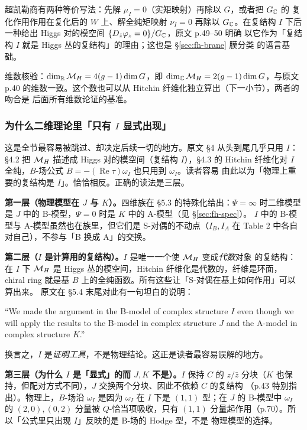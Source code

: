 \begin{remark}[两种商描述]
超凯勒商有两种等价写法：先解 $\mu_I=0$（实矩映射）再除以 $G$，或者把 $G_{\mathbb{C}}$ 的
复化作用作用在复化后的 $W$ 上、解全纯矩映射 $\nu_I=0$ 再除以 $G_{\mathbb{C}}$。在复结构 $I$
下后一种给出 Higgs 对的模空间 $\{D_{\bar z}\varphi_z=0\}/G_{\mathbb{C}}$，原文 p.49--50 明确
以它作为「复结构 $I$ 就是 Higgs 丛的复结构」的理由；这也是 §\ref{sec:fh-brane} 膜分类
的语言基础。\pA{}
\end{remark}

维数核验：$\dim_{\mathbb{R}}\mathcal{M}_H=4(g-1)\dim G$，即 $\dim_{\mathbb{C}}\mathcal{M}_H=2(g-1)\dim G$，与原文
p.40 的维数一致。这个数也可以从 Hitchin 纤维化独立算出（下一小节），两者的吻合是
后面所有维数论证的基准。\pA{}

\subsubsection*{为什么二维理论里「只有 $I$ 显式出现」}

这是全节最容易被跳过、却决定后续一切的地方。原文 §4 从头到尾几乎只用 $I$：
§4.2 把 $\mathcal{M}_H$ 描述成 Higgs 对的模空间（复结构 $I$），§4.3 的 Hitchin 纤维化对 $I$
全纯，$B$-场公式 $B=-(\operatorname{Re}\tau)\omega_I$ 也只用到 $\omega_I$。读者容易
由此以为「物理上重要的复结构是 $I$」。恰恰相反。正确的读法是三层。

\textbf{第一层（物理模型在 $J$ 与 $K$）。}四维族在 §5.3 的特殊化给出：$\Psi=\infty$
时二维模型是 $J$ 中的 B-模型，$\Psi=0$ 时是 $K$ 中的 A-模型（见 §\ref{sec:fh-spec}）。
$I$ 中的 B-模型与 A-模型虽然也在族里，但它们是 S-对偶的不动点（$I_B,I_A$ 在 Table 2
中各自对自己），不参与「B 换成 A」的交换。\pA{}

\textbf{第二层（$I$ 是计算用的复结构）。}$I$ 是唯一一个使 $\mathcal{M}_H$ 变成\emph{代数}对象
的复结构：在 $I$ 下 $\mathcal{M}_H$ 是 Higgs 丛的模空间，Hitchin 纤维化是代数的，纤维是环面，
chiral ring 就是基 $B$ 上的全纯函数。所有这些让「S-对偶在基上如何作用」可以算出来。
原文在 §5.4 末尾对此有一句坦白的说明：\pA{}
\begin{origquote}
“We made the argument in the B-model of complex structure $I$ even though we will apply the results to the B-model in complex structure $J$ and the A-model in complex structure $K$.” 
\end{origquote}
换言之，$I$ 是\emph{证明工具}，不是物理结论。这正是读者最容易误解的地方。

\textbf{第三层（为什么 $I$ 是「显式」的而 $J,K$ 不是）。}$I$ 保持 $C$ 的 $z/\bar z$
分块（$K$ 也保持，但配对方式不同），$J$ 交换两个分块、因此不依赖 $C$ 的复结构
（p.43 特别指出）。物理上，$B$-场沿 $\omega_I$ 是因为 $\omega_I$ 在 $I$ 下是 $(1,1)$
型；在 $J$ 的 B-模型中 $\omega_I$ 的 $(2,0),(0,2)$ 分量被 $Q$-恰当项吸收，只有
$(1,1)$ 分量起作用（p.70）。所以「公式里只出现 $I$」反映的是 B-场的 Hodge 型，不是
物理模型的选择。\pB{}

